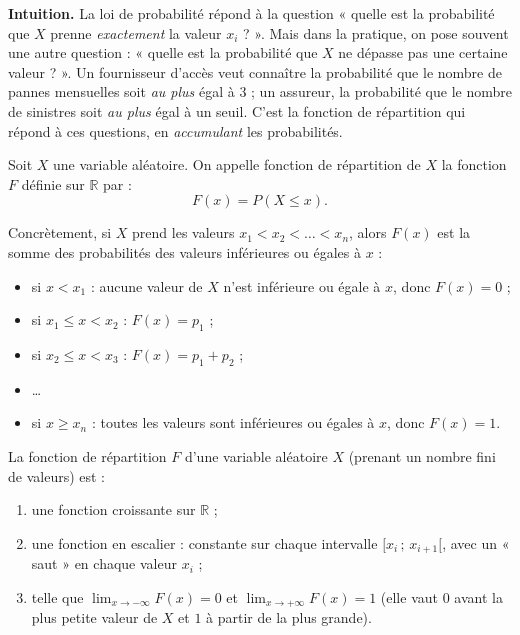 \documentclass[11pt]{article}
\newcommand{\cle}[1]{{\popxbold\color{popdark}#1}}
\newcounter{popsec}
\newcounter{popsub}
\newcommand{\courssub}[1]{%
  \stepcounter{popsub}%
  \par\vspace{9pt}\noindent{\popxbold\fontsize{11.5}{13}\selectfont\color{popink}{\color{poporange}\thepopsec.\thepopsub}\hspace{6pt}#1}\par\nopagebreak\vspace{4pt}
}
\begin{document}
\courssub{Fonction de répartition}

\textbf{Intuition.} La loi de probabilité répond à la question « quelle est la probabilité que $X$ prenne \emph{exactement} la valeur $x_i$ ? ». Mais dans la pratique, on pose souvent une autre question : « quelle est la probabilité que $X$ ne dépasse pas une certaine valeur ? ». Un fournisseur d'accès veut connaître la probabilité que le nombre de pannes mensuelles soit \emph{au plus} égal à $3$ ; un assureur, la probabilité que le nombre de sinistres soit \emph{au plus} égal à un seuil. C'est la fonction de répartition qui répond à ces questions, en \emph{accumulant} les probabilités.

\begin{definition}
Soit $X$ une variable aléatoire. On appelle \cle{fonction de répartition} de $X$ la fonction $F$ définie sur $\mathbb{R}$ par :
\[ F(x) = P(X \leq x). \]
\end{definition}

Concrètement, si $X$ prend les valeurs $x_1 < x_2 < \dots < x_n$, alors $F(x)$ est la somme des probabilités des valeurs inférieures ou égales à $x$ :
\begin{itemize}
\item si $x < x_1$ : aucune valeur de $X$ n'est inférieure ou égale à $x$, donc $F(x) = 0$ ;
\item si $x_1 \leq x < x_2$ : $F(x) = p_1$ ;
\item si $x_2 \leq x < x_3$ : $F(x) = p_1 + p_2$ ;
\item \dots
\item si $x \geq x_n$ : toutes les valeurs sont inférieures ou égales à $x$, donc $F(x) = 1$.
\end{itemize}

\begin{propriete}
La fonction de répartition $F$ d'une variable aléatoire $X$ (prenant un nombre fini de valeurs) est :
\begin{enumerate}
\item une fonction \cle{croissante} sur $\mathbb{R}$ ;
\item une fonction \cle{en escalier} : constante sur chaque intervalle $[x_i\,;\,x_{i+1}[$, avec un « saut » en chaque valeur $x_i$ ;
\item telle que $\displaystyle\lim_{x \to -\infty} F(x) = 0$ et $\displaystyle\lim_{x \to +\infty} F(x) = 1$ (elle vaut $0$ avant la plus petite valeur de $X$ et $1$ à partir de la plus grande).
\end{enumerate}
\end{propriete}
\end{document}
